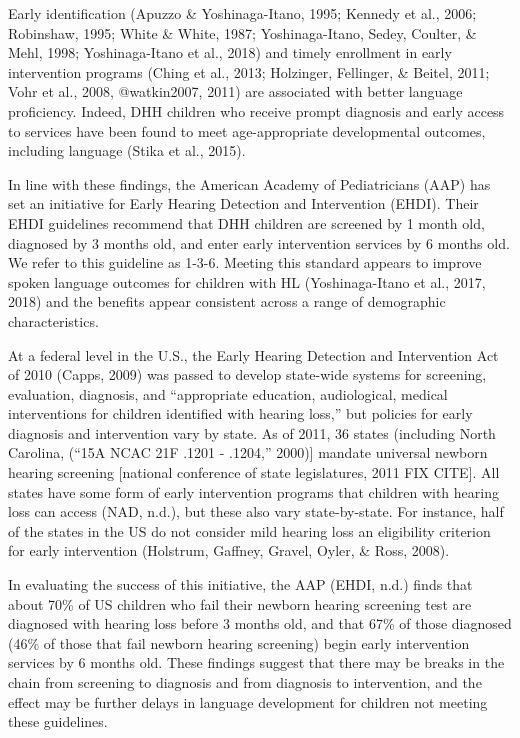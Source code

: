 \documentclass[english,man,floatsintext]{apa6}
\begin{document}
Early identification (Apuzzo \& Yoshinaga-Itano, 1995; Kennedy et al., 2006; Robinshaw, 1995; White \& White, 1987; Yoshinaga-Itano, Sedey, Coulter, \& Mehl, 1998; Yoshinaga-Itano et al., 2018) and timely enrollment in early intervention programs (Ching et al., 2013; Holzinger, Fellinger, \& Beitel, 2011; Vohr et al., 2008, @watkin2007, 2011) are associated with better language proficiency. Indeed, DHH children who receive prompt diagnosis and early access to services have been found to meet age-appropriate developmental outcomes, including language (Stika et al., 2015).

In line with these findings, the American Academy of Pediatricians (AAP) has set an initiative for Early Hearing Detection and Intervention (EHDI). Their EHDI guidelines recommend that DHH children are screened by 1 month old, diagnosed by 3 months old, and enter early intervention services by 6 months old. We refer to this guideline as 1-3-6. Meeting this standard appears to improve spoken language outcomes for children with HL (Yoshinaga-Itano et al., 2017, 2018) and the benefits appear consistent across a range of demographic characteristics.

At a federal level in the U.S., the Early Hearing Detection and Intervention Act of 2010 (Capps, 2009) was passed to develop state-wide systems for screening, evaluation, diagnosis, and \enquote{appropriate education, audiological, medical interventions for children identified with hearing loss,} but policies for early diagnosis and intervention vary by state. As of 2011, 36 states (including North Carolina, (``15A NCAC 21F .1201 - .1204,'' 2000){]} mandate universal newborn hearing screening {[}national conference of state legislatures, 2011 FIX CITE{]}. All states have some form of early intervention programs that children with hearing loss can access (NAD, n.d.), but these also vary state-by-state. For instance, half of the states in the US do not consider mild hearing loss an eligibility criterion for early intervention (Holstrum, Gaffney, Gravel, Oyler, \& Ross, 2008).

In evaluating the success of this initiative, the AAP (EHDI, n.d.) finds that about 70\% of US children who fail their newborn hearing screening test are diagnosed with hearing loss before 3 months old, and that 67\% of those diagnosed (46\% of those that fail newborn hearing screening) begin early intervention services by 6 months old. These findings suggest that there may be breaks in the chain from screening to diagnosis and from diagnosis to intervention, and the effect may be further delays in language development for children not meeting these guidelines.
\end{document}

